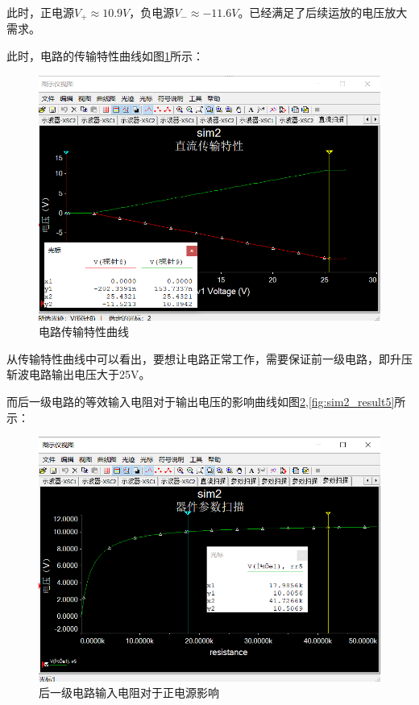\documentclass{article}
\begin{document}
\begin{spacing}{1.5}
    此时，正电源$ V_+ \approx 10.9V$，负电源$V_- \approx -11.6 V$。已经满足了后续运放的电压放大需求。
    
    此时，电路的传输特性曲线如图\ref{fig:sim2_result3}所示：

    \begin{figure}[H]
        \centering
        \includegraphics[scale=0.4]{fig/sim/sim2_result3.png}
        \caption{电路传输特性曲线}
        \label{fig:sim2_result3}
    \end{figure}
    
    从传输特性曲线中可以看出，要想让电路正常工作，需要保证前一级电路，即升压斩波电路输出电压大于25V。

    而后一级电路的等效输入电阻对于输出电压的影响曲线如图\ref{fig:sim2_result4},\ref{fig:sim2_result5}所示：
    \begin{figure}[H]
        \centering
        \includegraphics[scale=0.4]{fig/sim/sim2_result4.png}
        \caption{后一级电路输入电阻对于正电源影响}
        \label{fig:sim2_result4}
    \end{figure}
    

\end{spacing}
\end{document}
